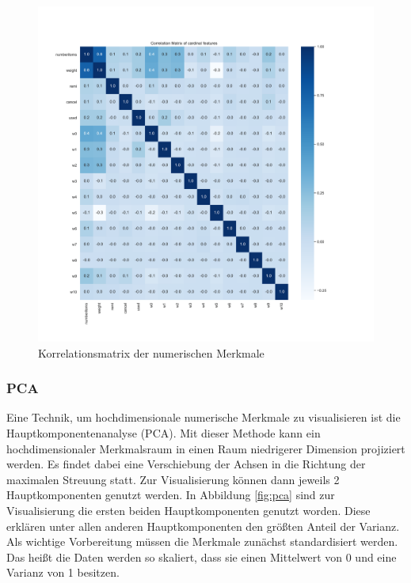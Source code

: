 \begin{figure}[!htbp]
\begin{center}
\includegraphics[scale=0.5]{pdf/correlation.pdf}
\end{center}
\caption{Korrelationsmatrix der numerischen Merkmale}
\label{fig:corr}
\end{figure}
\FloatBarrier

\subsubsection{PCA}
\label{sec:PCA}

Eine Technik, um hochdimensionale numerische Merkmale zu visualisieren ist die Hauptkomponentenanalyse (PCA). Mit dieser Methode kann ein hochdimensionaler Merkmalsraum in einen Raum niedrigerer Dimension projiziert werden. Es findet dabei eine Verschiebung der Achsen in die Richtung der maximalen Streuung statt. Zur Visualisierung können dann jeweils 2 Hauptkomponenten genutzt werden. In Abbildung \ref{fig:pca} sind zur Visualisierung die ersten beiden Hauptkomponenten genutzt worden. Diese erklären unter allen anderen Hauptkomponenten den größten Anteil der Varianz. Als wichtige Vorbereitung müssen die Merkmale zunächst standardisiert werden. Das heißt die Daten werden so skaliert, dass sie einen Mittelwert von 0 und eine Varianz von 1 besitzen. \\

